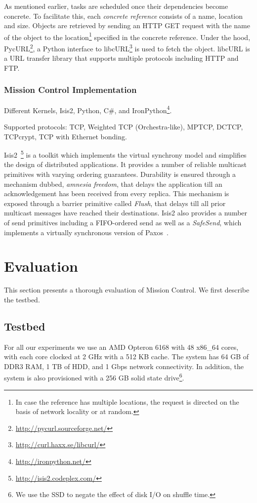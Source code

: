 \documentclass[a4paper,12pt,twoside,openright]{report}
\begin{document}
As mentioned earlier, tasks are scheduled once their dependencies become
concrete. To facilitate this, each \emph{concrete reference} consists of a name,
location and size. Objects are retrieved by sending an HTTP GET request with the
name of the object to the location\footnote{In case the reference has multiple
locations, the request is directed on the basis of network locality or at
random.} specified in the concrete reference. Under the hood,
PycURL\footnote{\url{http://pycurl.sourceforge.net/}}, a Python interface to
libcURL\footnote{\url{http://curl.haxx.se/libcurl/}} is used to fetch the
object. libcURL is a URL transfer library that supports multiple protocols
including HTTP and FTP.

\subsection{Mission Control Implementation}

Different Kernels, Isis2, Python, C\#, and
IronPython\footnote{\url{http://ironpython.net/}}.

Supported protocols: TCP, Weighted TCP (Orchestra-like), MPTCP, DCTCP, TCPcrypt,
TCP with Ethernet bonding.

Isis2~\cite{Birman:2012:OCW}\footnote{\url{http://isis2.codeplex.com/}} is a
toolkit which implements the virtual synchrony model and simplifies the design
of distributed applications. It provides a number of reliable multicast
primitives with varying ordering guarantees. Durability is ensured through a
mechanism dubbed, \emph{amnesia freedom}, that delays the application till an
acknowledgement has been received from every replica. This mechanism is exposed
through a barrier primitive called \emph{Flush}, that delays till all prior
multicast messages have reached their destinations. Isis2 also provides a number
of send primitives including a FIFO-ordered send as well as a \emph{SafeSend},
which implements a virtually synchronous version of
Paxos~\cite{Lamport:1998:PP}.

\chapter{Evaluation}\label{chapter:evaluation}
This section presents a thorough evaluation of Mission Control. We first
describe the testbed.

\section{Testbed}
For all our experiments we use an AMD Opteron 6168 with 48 x86\_64 cores, with
each core clocked at 2 GHz with a 512 KB cache. The system has 64 GB of DDR3
RAM, 1 TB of HDD, and 1 Gbps network connectivity. In addition, the system is
also provisioned with a 256 GB solid state drive\footnote{We use the SSD to
negate the effect of disk I/O on shuffle time.}.
\end{document}
